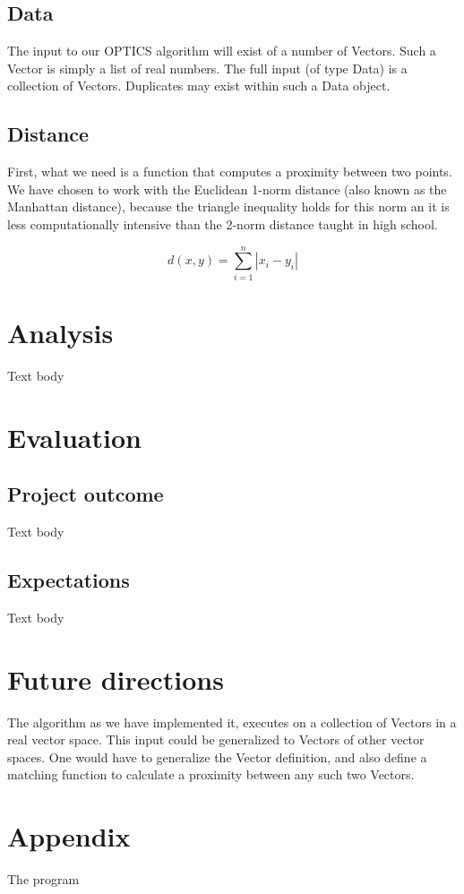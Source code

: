 \documentclass[12pt,a4paper]{article}
\begin{document}
\subsection{Data}
The input to our OPTICS algorithm will exist of a number of Vectors. Such a Vector is simply a list of real numbers. The full input (of type Data) is a collection of Vectors. Duplicates may exist within such a Data object.

\subsection{Distance}
First, what we need is a function that computes a proximity between two points. We have chosen to work with the Euclidean 1-norm distance (also known as the Manhattan distance), because the triangle inequality holds for this norm an it is less computationally intensive than the 2-norm distance taught in high school.

\begin{equation}
d(x,y)=\sum_{i=1}^n |x_i-y_i|
\end{equation}

\section{Analysis}
Text body

\section{Evaluation}
\subsection{Project outcome}
Text body
\subsection{Expectations}
Text body

\section{Future directions}
The algorithm as we have implemented it, executes on a collection of Vectors in a real vector space. This input could be generalized to Vectors of other vector spaces. One would have to generalize the Vector definition, and also define a matching function to calculate a proximity between any such two Vectors.

\section{Appendix}
The program
\end{document}
